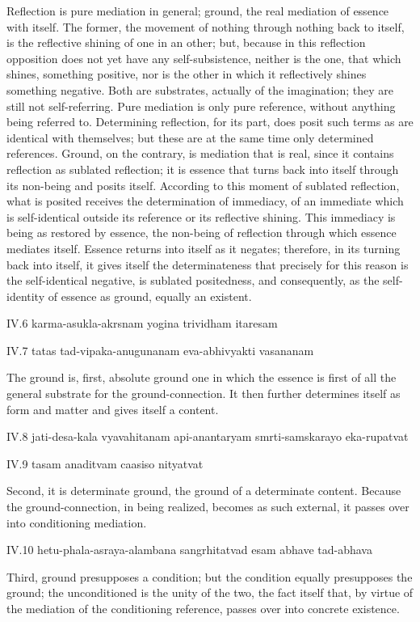 Reflection is pure mediation in general;
ground, the real mediation of essence with itself.
The former, the movement of nothing through nothing back to itself,
is the reflective shining of one in an other;
but, because in this reflection opposition does not yet have any self-subsistence,
neither is the one, that which shines, something positive,
nor is the other in which it reflectively shines something negative.
Both are substrates, actually of the imagination;
they are still not self-referring.
Pure mediation is only pure reference,
without anything being referred to.
Determining reflection, for its part, does posit
such terms as are identical with themselves;
but these are at the same time only determined references.
Ground, on the contrary, is mediation that is real,
since it contains reflection as sublated reflection;
it is essence that turns back into itself
through its non-being and posits itself.
According to this moment of sublated reflection,
what is posited receives the determination of immediacy,
of an immediate which is self-identical
outside its reference or its reflective shining.
This immediacy is being as restored by essence,
the non-being of reflection through which essence mediates itself.
Essence returns into itself as it negates;
therefore, in its turning back into itself,
it gives itself the determinateness that precisely
for this reason is the self-identical negative, is sublated positedness,
and consequently, as the self-identity of essence as ground,
equally an existent.

IV.6
karma-asukla-akrsnam yogina trividham itaresam

IV.7
tatas tad-vipaka-anugunanam eva-abhivyakti vasananam

The ground is, first, absolute ground
one in which the essence is first of all
the general substrate for the ground-connection.
It then further determines itself as form and matter
and gives itself a content.

IV.8
jati-desa-kala vyavahitanam api-anantaryam smrti-samskarayo eka-rupatvat

IV.9
tasam anaditvam caasiso nityatvat

Second, it is determinate ground,
the ground of a determinate content.
Because the ground-connection, in being realized,
becomes as such external,
it passes over into conditioning mediation.

IV.10
hetu-phala-asraya-alambana sangrhitatvad esam abhave tad-abhava

Third, ground presupposes a condition;
but the condition equally presupposes the ground;
the unconditioned is the unity of the two,
the fact itself that, by virtue of
the mediation of the conditioning reference,
passes over into concrete existence.

